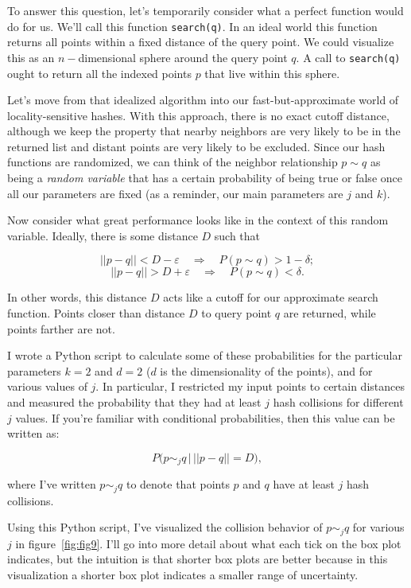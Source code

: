 \documentclass[20pt,]{extarticle}
\begin{document}
To answer this question, let's temporarily consider what a perfect
function would do for us. We'll call this function \texttt{search(q)}.
In an ideal world this function returns all points within a fixed
distance of the query point. We could visualize this as an
\(n-\)dimensional sphere around the query point \(q\). A call to
\texttt{search(q)} ought to return all the indexed points \(p\) that
live within this sphere.

Let's move from that idealized algorithm into our fast-but-approximate
world of locality-sensitive hashes. With this approach, there is no
exact cutoff distance, although we keep the property that nearby
neighbors are very likely to be in the returned list and distant points
are very likely to be excluded. Since our hash functions are randomized,
we can think of the neighbor relationship \(p\sim q\) as being a
\emph{random variable} that has a certain probability of being true or
false once all our parameters are fixed (as a reminder, our main
parameters are \(j\) and \(k\)).

Now consider what great performance looks like in the context of this
random variable. Ideally, there is some distance \(D\) such that

\[||p-q|| < D-\varepsilon \quad\Rightarrow\quad P(p\sim q) > 1 - \delta;\]
\[||p-q|| > D+\varepsilon \quad\Rightarrow\quad P(p\sim q) < \delta.\]

In other words, this distance \(D\) acts like a cutoff for our
approximate search function. Points closer than distance \(D\) to query
point \(q\) are returned, while points farther are not.

I wrote a Python script to calculate some of these probabilities for the
particular parameters \(k=2\) and \(d=2\) (\(d\) is the dimensionality
of the points), and for various values of \(j\). In particular, I
restricted my input points to certain distances and measured the
probability that they had at least \(j\) hash collisions for different
\(j\) values. If you're familiar with conditional probabilities, then
this value can be written as:

\[ P\big(p \sim_j q \, \big| \, ||p-q|| = D\big), \]

where I've written \(p\sim_j q\) to denote that points \(p\) and \(q\)
have at least \(j\) hash collisions.

Using this Python script, I've visualized the collision behavior of
\(p\sim_j q\) for various \(j\) in figure~\ref{fig:fig9}. I'll go into
more detail about what each tick on the box plot indicates, but the
intuition is that shorter box plots are better because in this
visualization a shorter box plot indicates a smaller range of
uncertainty.
\end{document}
